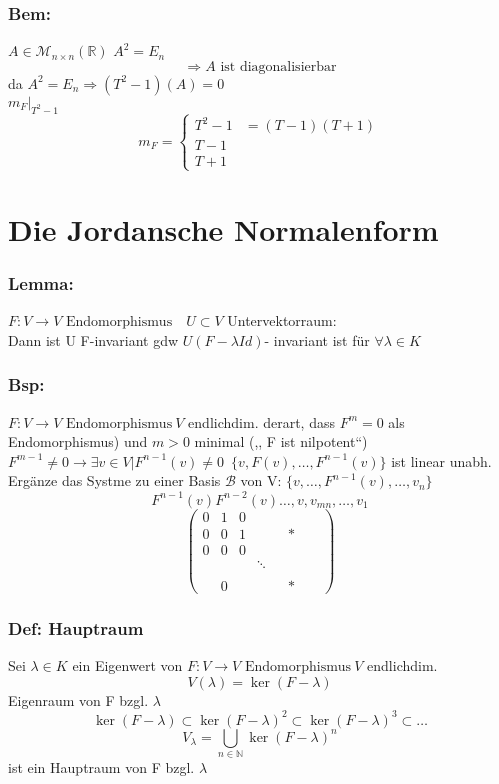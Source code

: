 \documentclass[titlepage,12pt,a4paper,ngerman]{report}
\newcommand{\tx}[1]{\textrm{#1}}
\newcommand{\enph}{F: V \to V \textrm{ Endomorphismus}}
\begin{document}
\subsection{Bem:} $A\in \mathcal{M}_{n \times n} (\mathbb{R})$
$ A^2 = E_n$
$$\Rightarrow A \tx{ ist diagonalisierbar}$$
da $A^2 = E_n \Rightarrow (T^2-1) (A) = 0$\\
$m_F | _{T^2-1}$
$$ m_F = \left\{ \begin{array}{ll}
T^2-1 & = (T-1)(T+1) \\
T-1 \\
T+1
\end{array} \right.$$

\chapter{Die Jordansche Normalenform}
\subsection{Lemma:}
$\enph \quad U \subset V$ Untervektorraum:\\
Dann ist U F-invariant gdw
$ U(F-\lambda Id)$- invariant ist für $ \forall \lambda \in K$
\subsection{Bsp:}
$\enph \ V$ endlichdim. derart, dass 
$F^m = 0$ als Endomorphismus) und $m>0$ minimal (,, F ist nilpotent``)\\
$ F^{m-1} \neq 0 \rightarrow \exists v \in V | F^{n-1}(v) \neq 0$\
$\{v,F(v),\dots,F^{n-1}(v)\}$ ist linear unabh.\\
Ergänze das Systme zu einer Basis $\mathcal{B}$ von V: $\{v, \dots , F^{n-1}(v), \dots , v_n\}$
$$F^{n-1}(v) F^{n-2}(v) \dots, v, v_{mn} , \dots , v_1$$
$$\begin{pmatrix}
0 & 1 & 0 & \\
0 & 0 & 1 & & & * & & \\
0 & 0 & 0 & \\
&&& \ddots\\ 
\\
& 0 & & & & *
\end{pmatrix}$$

\subsection{Def: Hauptraum}
Sei $\lambda \in K$ ein Eigenwert von $\enph \ V$ endlichdim.
$$ V(\lambda) = \ker ( F-\lambda )$$
Eigenraum von F bzgl. $\lambda$
$$ \ker(F-\lambda) \subset \ker(F-\lambda)^2 \subset \ker(F-\lambda)^3 \subset \dots$$
$$V_\lambda = \bigcup_{n\in \mathbb{N}} \ker(F-\lambda)^n$$
ist ein Hauptraum von F bzgl. $\lambda$
\end{document}
